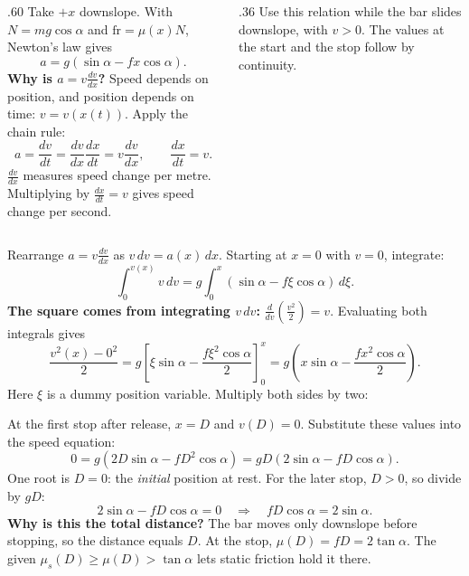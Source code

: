 \begin{solutionframe}
  \begin{columns}[T,onlytextwidth]
    \begin{column}{.60\textwidth}
      Take \(+x\) downslope. With \(N=mg\cos\alpha\) and
      \(\mathrm{fr}=\mu(x)N\), Newton's law gives
      \[
        a=g(\sin\alpha-fx\cos\alpha).
      \]
      \textbf{Why is \(a=v\frac{dv}{dx}\)?}
      Speed depends on position, and position depends on time:
      \(v=v(x(t))\). Apply the chain rule:
      \[
        a=\frac{dv}{dt}
        =\frac{dv}{dx}\frac{dx}{dt}
        =v\frac{dv}{dx},
        \qquad \frac{dx}{dt}=v.
      \]
      \(\frac{dv}{dx}\) measures speed change per metre.
      Multiplying by \(\frac{dx}{dt}=v\) gives speed change per second.
    \end{column}
    \begin{column}{.36\textwidth}
      \medskip
      Use this relation while the bar slides downslope, with \(v>0\).
      The values at the start and the stop follow by continuity.
    \end{column}
  \end{columns}
\end{solutionframe}

\begin{solutionframe}
  \par
  Rearrange \(a=v\frac{dv}{dx}\) as \(v\,dv=a(x)\,dx\).
  Starting at \(x=0\) with \(v=0\), integrate:
  \[
    \int_0^{v(x)}v\,dv
      =g\int_0^x(\sin\alpha-f\xi\cos\alpha)\,d\xi.
  \]
  \textbf{The square comes from integrating \(v\,dv\):}
  \(\frac{d}{dv}\left(\frac{v^2}{2}\right)=v\).
  Evaluating both integrals gives
  \[
    \frac{v^2(x)-0^2}{2}
      =g\left[\xi\sin\alpha-\frac{f\xi^2\cos\alpha}{2}\right]_0^x
      =g\left(x\sin\alpha-\frac{fx^2\cos\alpha}{2}\right).
  \]
  Here \(\xi\) is a dummy position variable. Multiply both sides by two:
\end{solutionframe}

\begin{solutionframe}
  \par
  At the first stop after release, \(x=D\) and \(v(D)=0\).
  Substitute these values into the speed equation:
  \[
    0=g(2D\sin\alpha-fD^2\cos\alpha)
      =gD(2\sin\alpha-fD\cos\alpha).
  \]
  One root is \(D=0\): the \emph{initial} position at rest.
  For the later stop, \(D>0\), so divide by \(gD\):
  \[
    2\sin\alpha-fD\cos\alpha=0
    \quad\Rightarrow\quad fD\cos\alpha=2\sin\alpha.
  \]
  \textbf{Why is this the total distance?}
  The bar moves only downslope before stopping, so the distance equals \(D\).
  At the stop, \(\mu(D)=fD=2\tan\alpha\).
  The given \(\mu_s(D)\ge\mu(D)>\tan\alpha\) lets static friction hold it there.
\end{solutionframe}

